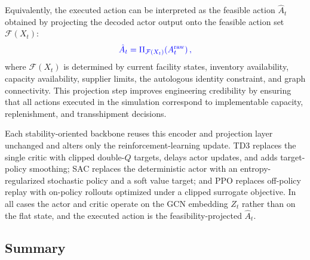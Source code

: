 \documentclass[preprint,review,12pt,nonatbib]{elsarticle}
\providecommand{\DIFadd}[1]{{\protect\color{blue}#1}} %
\providecommand{\DIFdel}[1]{} %
\providecommand{\DIFaddbegin}{} %
\providecommand{\DIFaddend}{} %
\providecommand{\DIFdelbegin}{} %
\providecommand{\DIFdelend}{} %
\providecommand{\DIFscaledelfig}{0.5}
\newlength{\DIFdelgraphicswidth} %
\newlength{\DIFdelgraphicsheight} %
\providecommand{\DIFaddincludegraphics}[2][]{{\color{blue}\fbox{\DIFOincludegraphics[#1]{#2}}}} %
\providecommand{\DIFdelincludegraphics}[2][]{%
\sbox{\DIFdelgraphicsbox}{\DIFOincludegraphics[#1]{#2}}%
\settoboxwidth{\DIFdelgraphicswidth}{\DIFdelgraphicsbox} %
\settoboxtotalheight{\DIFdelgraphicsheight}{\DIFdelgraphicsbox} %
\scalebox{\DIFscaledelfig}{%
\parbox[b]{\DIFdelgraphicswidth}{\usebox{\DIFdelgraphicsbox}\\[-\baselineskip] \rule{\DIFdelgraphicswidth}{0em}}\llap{\resizebox{\DIFdelgraphicswidth}{\DIFdelgraphicsheight}{%
\setlength{\unitlength}{\DIFdelgraphicswidth}%
\begin{picture}(1,1)%
\thicklines\linethickness{2pt} %
{\color[rgb]{1,0,0}\put(0,0){\framebox(1,1){}}}%
{\color[rgb]{1,0,0}\put(0,0){\line( 1,1){1}}}%
{\color[rgb]{1,0,0}\put(0,1){\line(1,-1){1}}}%
\end{picture}%
}\hspace*{3pt}}} %
} %
\DeclareRobustCommand{\DIFaddbegin}{\DIFOaddbegin \let\includegraphics\DIFaddincludegraphics} %
\DeclareRobustCommand{\DIFaddend}{\DIFOaddend \let\includegraphics\DIFOincludegraphics} %
\DeclareRobustCommand{\DIFdelbegin}{\DIFOdelbegin \let\includegraphics\DIFdelincludegraphics} %
\DeclareRobustCommand{\DIFdelend}{\DIFOaddend \let\includegraphics\DIFOincludegraphics} %
\begin{document}
Equivalently, the executed action can be interpreted as the feasible action $\hat{A}_t$ obtained by projecting the decoded actor output onto the feasible action set $\mathcal{F}(X_t)$:
\DIFdelbegin %
\DIFdel{$\hat{A}_t = \Pi_{\mathcal{F}(X_t)}(A_t^{\mathrm{raw}}),$
}%
\DIFdelend \DIFaddbegin \begin{equation}
\DIFadd{\hat{A}_t = \Pi_{\mathcal{F}(X_t)}\!\left(A_t^{\mathrm{raw}}\right),
}\end{equation}
\DIFaddend where $\mathcal{F}(X_t)$ is determined by current facility states, inventory availability, capacity availability, supplier limits, \DIFaddbegin \DIFadd{the autologous identity constraint, }\DIFaddend and graph connectivity. This projection step improves engineering credibility by ensuring that all actions executed in the simulation correspond to implementable capacity, replenishment, and transshipment decisions.


\DIFdelbegin %
\textbf{\DIFdel{GCN Encoder:}} %
\DIFdel{Each facility node $i$ aggregates features from its neighbors $\mathcal{N}(i)$ using layer-wise message passing:
}\[
\DIFdel{h_i^{(l+1)} = \sigma\!\left(W^{(l)} \sum_{j \in \mathcal{N}(i)} h_j^{(l)}\right),
}\]%
\DIFdel{where $W^{(l)}$ are trainable weights and $\sigma(\cdot)$ is an activation function. 
This produces graph-embedded representations used by the actor–critic networks for coordinated decision-making. }\DIFdelend \DIFaddbegin \DIFadd{Each stability-oriented backbone reuses this encoder and projection layer unchanged and alters only the reinforcement-learning update. TD3 replaces the single critic with clipped double-$Q$ targets, delays actor updates, and adds target-policy smoothing; SAC replaces the deterministic actor with an entropy-regularized stochastic policy and a soft value target; and PPO replaces off-policy replay with on-policy rollouts optimized under a clipped surrogate objective. In all cases the actor and critic operate on the GCN embedding $Z_t$ rather than on the flat state, and the executed action is the feasibility-projected $\hat{A}_t$.
}\DIFaddend 

\DIFdelbegin \subsection*{\DIFdel{Anticipated Outcomes and Benefits}}
\DIFdelend \DIFaddbegin \subsection*{\DIFadd{Summary}}
\DIFaddend 
\end{document}
